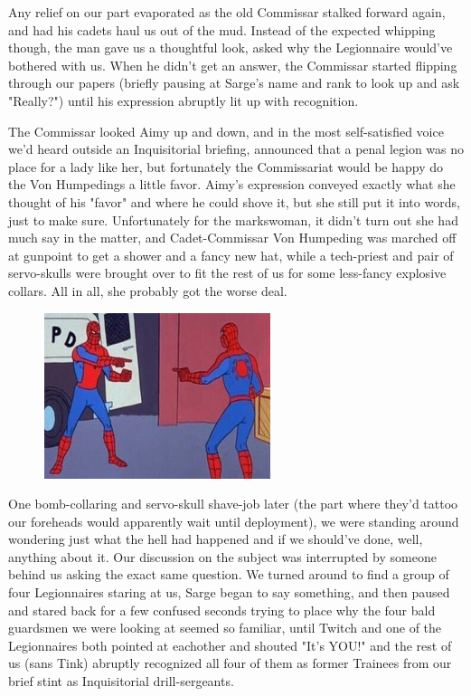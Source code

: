Any relief on our part evaporated as the old Commissar stalked forward again, and had his cadets haul us out of the mud. 
Instead of the expected whipping though, the man gave us a thoughtful look, asked why the Legionnaire would've bothered with us. 
When he didn't get an answer, the Commissar started flipping through our papers (briefly pausing at Sarge's name and rank to look up and ask "Really?") until his expression abruptly lit up with recognition.

The Commissar looked Aimy up and down, and in the most self-satisfied voice we'd heard outside an Inquisitorial briefing, announced that a penal legion was no place for a lady like her, but fortunately the Commissariat would be happy do the Von Humpedings a little favor. 
Aimy's expression conveyed exactly what she thought of his "favor" and where he could shove it, but she still put it into words, just to make sure. 
Unfortunately for the markswoman, it didn't turn out she had much say in the matter, and Cadet-Commissar Von Humpeding was marched off at gunpoint to get a shower and a fancy new hat, while a tech-priest and pair of servo-skulls were brought over to fit the rest of us for some less-fancy explosive collars. 
All in all, she probably got the worse deal.

\begin{figure}
	\begin{center}
		\includegraphics[width=\figwidth]{pics/21/11.png}
	\end{center}
\end{figure}
One bomb-collaring and servo-skull shave-job later (the part where they'd tattoo our foreheads would apparently wait until deployment), we were standing around wondering just what the hell had happened and if we should've done, well, anything about it. 
Our discussion on the subject was interrupted by someone behind us asking the exact same question. 
We turned around to find a group of four Legionnaires staring at us, Sarge began to say something, and then paused and stared back for a few confused seconds trying to place why the four bald guardsmen we were looking at seemed so familiar, until Twitch and one of the Legionnaires both pointed at eachother and shouted "It's YOU!" and the rest of us (sans Tink) abruptly recognized all four of them as former Trainees from our brief stint as Inquisitorial drill-sergeants. 


